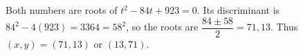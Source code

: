 Both numbers are roots of $t^2-84t+923=0$. Its discriminant is $84^2-4(923)=3364=58^2$, so the roots are $\dfrac{84\pm58}{2}=71,13$. Thus $\boxed{(x,y)=(71,13)\text{ or }(13,71)}$.
